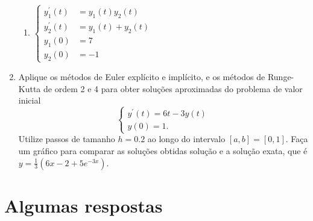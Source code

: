 \documentclass[12pt,a4paper]{article}
\begin{document}
\begin{enumerate}
\begin{multicols}{2}
\begin{enumerate}
\item $\begin{cases}
y_1^\prime(t) &= y_1(t) y_2(t)\\
y_2^\prime(t) &= y_1(t)+y_2(t)\\
y_1(0) &= 7\\
y_2(0) &= -1
\end{cases}$
\end{enumerate}
\end{multicols}

\item Aplique os métodos de Euler explícito e implícito, e os métodos de Runge-Kutta de ordem 2 e 4 para obter soluções aproximadas do problema de valor inicial
\[
\begin{cases}
y^\prime(t) = 6t - 3y(t) \\
y(0) = 1.
\end{cases}\]
Utilize passos de tamanho $h = 0.2$ ao longo do intervalo $[a,b] = [0, 1]$. Faça um gráfico para comparar as soluções obtidas solução e a solução exata, que é $y = \frac{1}{3} (6 x - 2 + 5 e^{-3 x})$.
\end{enumerate}

\newpage
\section*{Algumas respostas}
\end{document}
